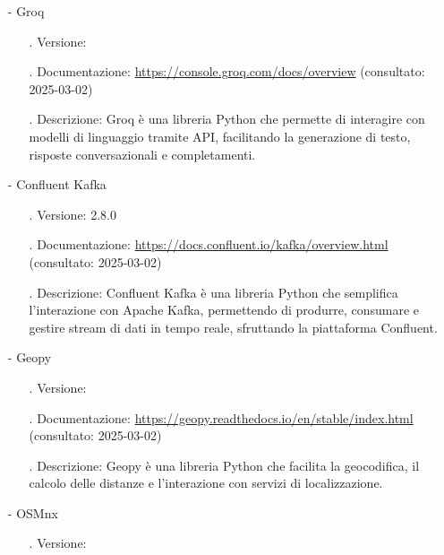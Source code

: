 \documentclass[10pt]{article}
\begin{document}
\begin{justify}
\begin{itemize}
\begin{itemize}
                        \end{itemize}
                    \item[-] Groq
                        \begin{itemize}
                            \item[.] Versione:
                            \item[.] Documentazione: \url{https://console.groq.com/docs/overview} (consultato: 2025-03-02)
                            \item[.] Descrizione: Groq è una libreria Python che permette di interagire con modelli di linguaggio tramite API, facilitando la 
                            generazione di testo, risposte conversazionali e completamenti.
                        \end{itemize}
                    \item[-] Confluent Kafka
                        \begin{itemize}
                            \item[.] Versione: 2.8.0
                            \item[.] Documentazione: \url{https://docs.confluent.io/kafka/overview.html} (consultato: 2025-03-02)
                            \item[.] Descrizione: Confluent Kafka è una libreria Python che semplifica l’interazione con Apache Kafka, permettendo di produrre, 
                            consumare e gestire stream di dati in tempo reale, sfruttando la piattaforma Confluent.
                        \end{itemize}
                    \item[-] Geopy
                    \begin{itemize}
                        \item[.] Versione:
                        \item[.] Documentazione: \url{https://geopy.readthedocs.io/en/stable/index.html} (consultato: 2025-03-02)
                        \item[.] Descrizione: Geopy è una libreria Python che facilita la geocodifica, il calcolo delle distanze e l'interazione con servizi di localizzazione.
                    \end{itemize}
                    \item[-] OSMnx
                        \begin{itemize}
                            \item[.] Versione:

\end{itemize}
\end{itemize}
\end{justify}
\end{document}
